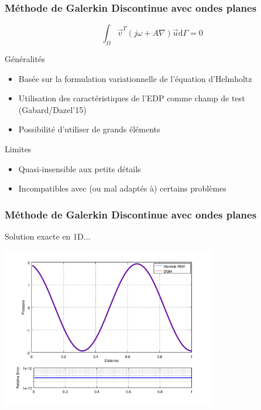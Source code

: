 \documentclass[10pt, compress]{beamer}
\begin{document}
\begin{frame}
	\frametitle{Méthode de Galerkin Discontinue avec ondes planes}

	$$\int_\Omega \vec{v}^T\left(j\omega + A\nabla\right)\vec{u}\mathrm{d}\Gamma = 0$$

	\begin{block}{Généralités}
		\begin{itemize}
			\item Basée sur la formulation variationnelle de l'équation d'Helmholtz
			\item Utilisation des caractéristiques de l'EDP comme champ de test (Gabard/Dazel'15)
			\item Possibilité d'utiliser de grands éléments
		\end{itemize}
	\end{block}
	\begin{block}{Limites}
		\begin{itemize}
			\item Quasi-insensible aux petits détails
			\item Incompatibles avec (ou mal adaptés à) certains problèmes
		\end{itemize}
	\end{block}
\end{frame}

\begin{frame}
	\frametitle{Méthode de Galerkin Discontinue avec ondes planes}

	\begin{block}{Solution exacte en 1D...}
		\begin{center}
		\includegraphics[width=0.7\textwidth]{comp_hermiteFEM_dgm.png}
		\end{center}
	\end{block}
\end{frame}
\end{document}
